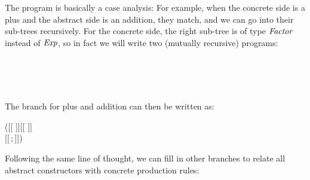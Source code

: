The program is basically a case analysis: For example, when the concrete side is a plus and the abstract side is an addition, they match, and we can go into their sub-trees recursively.
For the concrete side, the right sub-tree is of type \ensuremath{\Conid{Factor}} instead of \ensuremath{\Conid{Exp}}, so in fact we will write two (mutually recursive) programs:
\begin{hscode}\SaveRestoreHook
{}%
%
%
%
%
\>[B]{}\<[15]%
\>[15]{}\mathbin{::}{}\<[15E]%
\>[19]{}\;\;\<[E]%
\\
\>[B]{}\<[15]%
\>[15]{}\mathrel{=}{}\<[15E]%
\>[19]{}\;\bot {}\<[E]%
\\[\blanklineskip]%
\>[B]{}\<[15]%
\>[15]{}\mathbin{::}{}\<[15E]%
\>[19]{}\;\;\<[E]%
\\
\>[B]{}\<[15]%
\>[15]{}\mathrel{=}{}\<[15E]%
\>[19]{}\;\bot {}\<[E]%
\ColumnHook
\end{hscode}\resethooks
The branch for plus and addition can then be written as:
\begin{hscode}\SaveRestoreHook
{}%
%
%
\>[B]{}{^\$}(\;{}\<[11]%
\>[11]{}[\kern-1.5pt[\,\;\;\,]\kern-1.5pt]\;[\kern-1.5pt[\,\;\;\,]\kern-1.5pt]\;{}\<[E]%
\\
[\kern-1.5pt[\,\mathrel{=};\mathrel{=}\,]\kern-1.5pt]){}\<[E]%
\ColumnHook
\end{hscode}\resethooks
Following the same line of thought, we can fill in other branches to relate all abstract constructors with concrete production rules:
